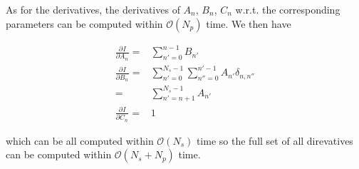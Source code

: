 \documentclass[10pt,fleqn]{article}
\newcommand{\eqar}[1]
{
  \begin{align*}
    #1
  \end{align*}
}
\newcommand{\pdiff}[3][{}]{{\frac{\partial^{#1} {#2}}{\partial {#3}{}^{#1}}}}
\begin{document}
As for the derivatives, the derivatives of $A_n$, $B_n$, $C_n$ w.r.t.
the corresponding parameters can be computed within $\mathcal{O}(N_p)$ time.
We then have
\eqar{
  \pdiff{I}{A_n}=&\sum_{n'=0}^{n-1}B_{n'}\\
  \pdiff{I}{B_n}=&\sum_{n'=0}^{N_s-1}\sum_{n''=0}^{n'-1}A_{n'}\delta_{n,n''}\\
  =&\sum_{n'=n+1}^{N_s-1}A_{n'}\\
  \pdiff{I}{C_n}=&1
}
which can be all computed within $\mathcal{O}(N_s)$ time so the full set of
all direvatives can be computed within $\mathcal{O}(N_s+N_p)$ time.
\end{document}
